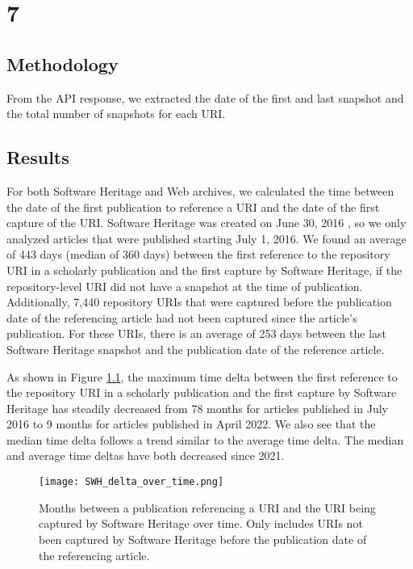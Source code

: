 \chapter{7}
\label{ch:7}

\section{Methodology}
From the API response, we extracted the date of the first and last snapshot and the total number of snapshots for each URI. 

\section{Results}
For both Software Heritage and Web archives, we calculated the time between the date of the first publication to reference a URI and the date of the first capture of the URI. Software Heritage was created on June 30, 2016 \cite{dicosmo_swhblog}, so we only analyzed articles that were published starting July 1, 2016. We found an average of 443 days (median of 360 days) between the first reference to the repository URI in a scholarly publication and the first capture by Software Heritage, if the repository-level URI did not have a snapshot at the time of publication. Additionally, 7,440 repository URIs that were captured before the publication date of the referencing article had not been captured since the article's publication. For these  URIs, there is an average of 253 days between the last Software Heritage snapshot and the publication date of the reference article. 

As shown in Figure \ref{fig:swh_delta},
the maximum time delta between the first reference to the repository URI in a scholarly publication and the first capture by Software Heritage has steadily decreased from 78 months for articles published in July 2016 to 9 months for articles published in April 2022. We also see that the median time delta follows a trend similar to the average time delta. The median and average time deltas have both decreased since 2021. 

\begin{figure}
    \centering
    \texttt{[image: SWH\_delta\_over\_time.png]}
    \caption{Months between a publication referencing a URI and the URI being captured by Software Heritage over time. Only includes URIs not been captured by Software Heritage before the publication date of the referencing article.}
    \label{fig:swh_delta}
\end{figure}

